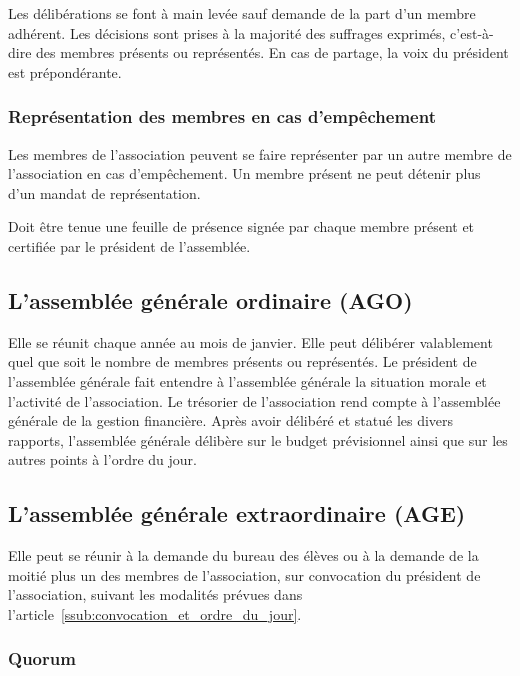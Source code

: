 \documentclass{article}
\begin{document}
				Les délibérations se font à main levée sauf demande de la part
				d’un membre adhérent. Les décisions sont prises à la majorité
				des suffrages exprimés, c’est-à-dire des membres présents ou
				représentés. En cas de partage, la voix du président est
				prépondérante.

			\subsubsection{Représentation des membres en cas d'empêchement}
\label{ssub:representation_des_membres_en_cas_d_empechement}

				Les membres de l’association peuvent se faire représenter par un
				autre membre de l’association en cas d’empêchement. Un membre
				présent ne peut détenir plus d’un mandat de représentation.

				Doit être tenue une feuille de présence signée par chaque membre
				présent et certifiée par le président de l’assemblée.

		\subsection{L'assemblée générale ordinaire (AGO)}
\label{sub:l_assemblee_generale_ordinaire_ago_}
		
			Elle se réunit chaque année au mois de janvier. Elle peut délibérer
			valablement quel que soit le nombre de membres présents ou
			représentés. Le président de l’assemblée générale fait entendre à
			l’assemblée générale la situation morale et l’activité de
			l’association. Le trésorier de l’association rend compte à
			l’assemblée générale de la gestion financière. Après avoir délibéré
			et statué les divers rapports, l’assemblée générale délibère sur le
			budget prévisionnel ainsi que sur les autres points à l’ordre du
			jour.

		\subsection{L'assemblée générale extraordinaire (AGE)}
\label{sub:l_assemblee_generale_extraordinaire_age_}
		
			Elle peut se réunir à la demande du bureau des élèves ou à la
			demande de la moitié plus un des membres de l’association, sur
			convocation du président de l’association, suivant les modalités
			prévues dans l’article~\ref{ssub:convocation_et_ordre_du_jour}.

			\subsubsection{Quorum}
\label{ssub:quorum}
		
\end{document}
